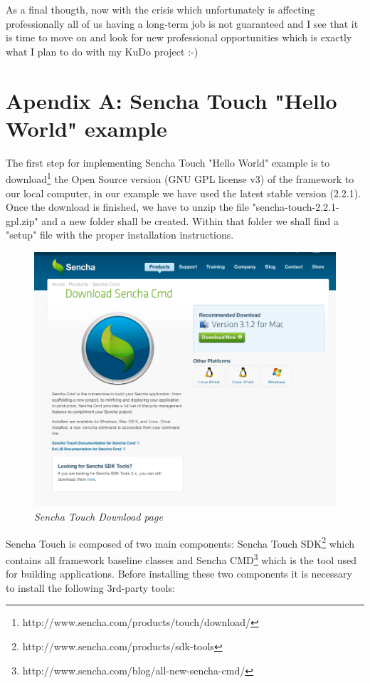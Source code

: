 \documentclass[a4paper,12pt]{book}
\begin{document}
As a final thougth, now with the crisis which unfortunately is affecting professionally all of us having a long-term job is not guaranteed and I see that it is time to move on and look for new professional opportunities which is exactly what I plan to do with my KuDo project :-)


\chapter{Apendix A: Sencha Touch "Hello World" example}
\label{Apendix A: Sencha Touch "Hello World" example}

The first step for implementing Sencha Touch "Hello World" example is to download\footnote{http://www.sencha.com/products/touch/download/} the Open Source version (GNU GPL license v3) of the framework to our local computer, in our example we have used the latest stable version (2.2.1). Once the download is finished, we have to unzip the file "sencha-touch-2.2.1-gpl.zip" and a new folder shall be created. Within that folder we shall find a "setup" file with the proper installation instructions.

\begin{figure}[H]
    \centering
    \includegraphics[width=12cm, keepaspectratio]{img/sencha1.png}
    \caption{\textit{Sencha Touch Download page}}
 \end{figure}

Sencha Touch is composed of two main components: Sencha Touch SDK\footnote{http://www.sencha.com/products/sdk-tools} which contains all framework baseline classes and Sencha CMD\footnote{http://www.sencha.com/blog/all-new-sencha-cmd/} which is the tool used for building applications. Before installing these two components it is necessary to install the following 3rd-party tools:
\end{document}
